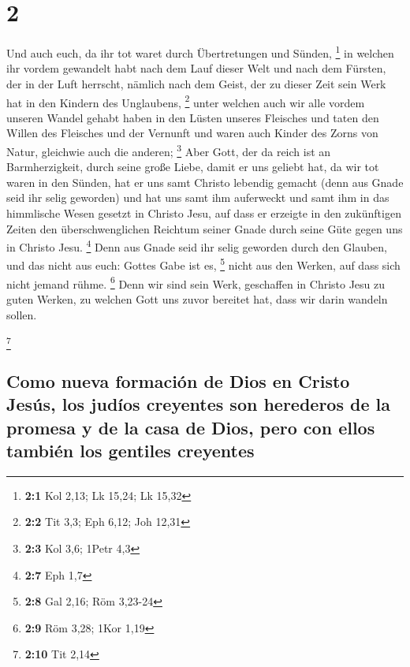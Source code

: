 \hypertarget{section-1}{%
\section{2}\label{section-1}}

 Und auch euch, da ihr tot waret durch Übertretungen und
Sünden, \footnote{\textbf{2:1} Kol 2,13; Lk 15,24; Lk 15,32}
 in welchen ihr vordem gewandelt habt nach dem Lauf dieser
Welt und nach dem Fürsten, der in der Luft herrscht, nämlich nach dem
Geist, der zu dieser Zeit sein Werk hat in den Kindern des Unglaubens,
\footnote{\textbf{2:2} Tit 3,3; Eph 6,12; Joh 12,31} 
unter welchen auch wir alle vordem unseren Wandel gehabt haben in den
Lüsten unseres Fleisches und taten den Willen des Fleisches und der
Vernunft und waren auch Kinder des Zorns von Natur, gleichwie auch die
anderen; \footnote{\textbf{2:3} Kol 3,6; 1Petr 4,3}  Aber
Gott, der da reich ist an Barmherzigkeit, durch seine große Liebe, damit
er uns geliebt hat,  da wir tot waren in den Sünden, hat
er uns samt Christo lebendig gemacht (denn aus Gnade seid ihr selig
geworden)  und hat uns samt ihm auferweckt und samt ihm in
das himmlische Wesen gesetzt in Christo Jesu,  auf dass er
erzeigte in den zukünftigen Zeiten den überschwenglichen Reichtum seiner
Gnade durch seine Güte gegen uns in Christo Jesu. \footnote{\textbf{2:7}
  Eph 1,7}  Denn aus Gnade seid ihr selig geworden durch
den Glauben, und das nicht aus euch: Gottes Gabe ist es, \footnote{\textbf{2:8}
  Gal 2,16; Röm 3,23-24}  nicht aus den Werken, auf dass
sich nicht jemand rühme. \footnote{\textbf{2:9} Röm 3,28; 1Kor 1,19}
 Denn wir sind sein Werk, geschaffen in Christo Jesu zu
guten Werken, zu welchen Gott uns zuvor bereitet hat, dass wir darin
wandeln sollen.

\footnote{\textbf{2:10} Tit 2,14}

\hypertarget{como-nueva-formaciuxf3n-de-dios-en-cristo-jesuxfas-los-juduxedos-creyentes-son-herederos-de-la-promesa-y-de-la-casa-de-dios-pero-con-ellos-tambiuxe9n-los-gentiles-creyentes}{%
\subsection{Como nueva formación de Dios en Cristo Jesús, los judíos
creyentes son herederos de la promesa y de la casa de Dios, pero con
ellos también los gentiles
creyentes}\label{como-nueva-formaciuxf3n-de-dios-en-cristo-jesuxfas-los-juduxedos-creyentes-son-herederos-de-la-promesa-y-de-la-casa-de-dios-pero-con-ellos-tambiuxe9n-los-gentiles-creyentes}}

